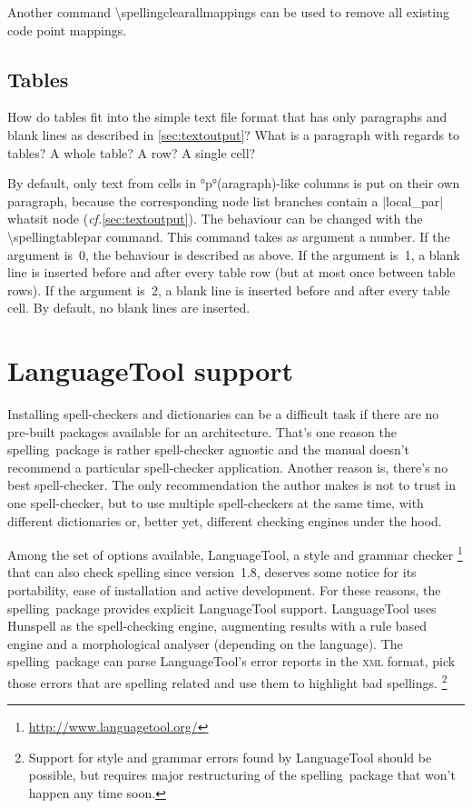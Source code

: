 \documentclass[11pt]{article}
\newcommand*{\pkg}{\textsf{spelling}}
\newcommand*{\acr}[1]{\mbox{\scshape#1}}
\newcommand*{\cmd}[1]{\mbox{\ttfamily\textbackslash#1}}
\newcommand*{\macro}[1]{\cmd{#1}\marginpar{\cmd{#1}}}
\newcommand*{\latinphrase}[1]{\foreignlanguage{latin}{\emph{#1}}}
\newcommand*{\lpcf}{\latinphrase{cf.}\xspace}
\begin{document}
Another command \macro{spellingclearallmappings} can be used to remove
all existing code point mappings.


\subsection{Tables}
\label{sec:tables}

How do tables fit into the simple text file format that has only
paragraphs and blank lines as described in \autoref{sec:textoutput}?
What is a paragraph with regards to tables?  A whole table?  A row?  A
single cell?

By default, only text from cells in °p°(aragraph)-like columns is put on
their own paragraph, because the corresponding node list branches
contain a |local_par| whatsit node (\lpcf \autoref{sec:textoutput}).
The behaviour can be changed with the \macro{spellingtablepar} command.
This command takes as argument a number.  If the argument is~0, the
behaviour is described as above.  If the argument is~1, a blank line is
inserted before and after every table row (but at most once between
table rows).  If the argument is~2, a blank line is inserted before and
after every table cell.  By default, no blank lines are inserted.


\section{LanguageTool support}
\label{sec:languagetool}

Installing spell-checkers and dictionaries can be a difficult task if
there are no pre-built packages available for an architecture.  That's
one reason the \pkg\ package is rather spell-checker agnostic and the
manual doesn't recommend a particular spell-checker application.
Another reason is, there's no best spell-checker.  The only
recommendation the author makes is not to trust in one spell-checker,
but to use multiple spell-checkers at the same time, with different
dictionaries or, better yet, different checking engines under the hood.

Among the set of options available, LanguageTool, a style and grammar
checker%
\footnote{\url{http://www.languagetool.org/}}
%
that can also check spelling since version~1.8, deserves some notice for
its portability, ease of installation and active development.  For these
reasons, the \pkg\ package provides explicit LanguageTool support.
LanguageTool uses Hunspell as the spell-checking engine, augmenting
results with a rule based engine and a morphological analyser (depending
on the language).  The \pkg\ package can parse LanguageTool's error
reports in the \acr{xml} format, pick those errors that are spelling
related and use them to highlight bad spellings.%
\footnote{Support for style and grammar errors found by LanguageTool
  should be possible, but requires major restructuring of the \pkg\
  package that won't happen any time soon.}
\end{document}
